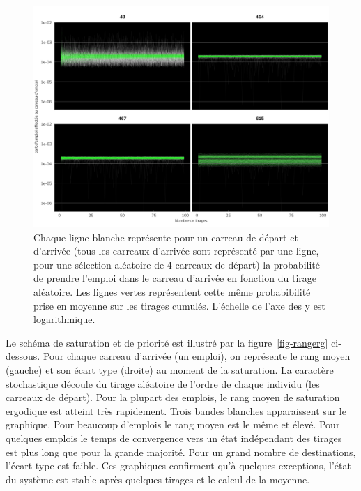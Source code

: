 \documentclass[
  10pt,
  a4paper,
  numbers=noendperiod,
  DIV=9]{scrreprt}
\begin{document}
\begin{figure}[htb]

{\centering \includegraphics[width=1\textwidth,height=\textheight]{./output/gemploi_erg.png}

}

\caption[Affectation de l'emploi pour des carreaux de
départ]{\label{fig-emperg}Chaque ligne blanche représente pour un
carreau de départ et d'arrivée (tous les carreaux d'arrivée sont
représenté par une ligne, pour une sélection aléatoire de 4 carreaux de
départ) la probabilité de prendre l'emploi dans le carreau d'arrivée en
fonction du tirage aléatoire. Les lignes vertes représentent cette même
probabibilité prise en moyenne sur les tirages cumulés. L'échelle de
l'axe des y est logarithmique.}

\end{figure}

Le schéma de saturation et de priorité est illustré par la
figure~\ref{fig-rangerg} ci-dessous. Pour chaque carreau d'arrivée (un
emploi), on représente le rang moyen (gauche) et son écart type (droite)
au moment de la saturation. La caractère stochastique découle du tirage
aléatoire de l'ordre de chaque individu (les carreaux de départ). Pour
la plupart des emplois, le rang moyen de saturation ergodique est
atteint très rapidement. Trois bandes blanches apparaissent sur le
graphique. Pour beaucoup d'emplois le rang moyen est le même et élevé.
Pour quelques emplois le temps de convergence vers un état indépendant
des tirages est plus long que pour la grande majorité. Pour un grand
nombre de destinations, l'écart type est faible. Ces graphiques
confirment qu'à quelques exceptions, l'état du système est stable après
quelques tirages et le calcul de la moyenne.
\end{document}
